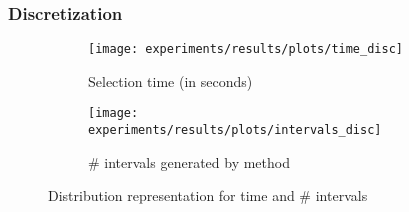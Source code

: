 \documentclass[preprint,12pt]{elsarticle}
\begin{document}
\begin{table}[!htp]
\renewcommand{\arraystretch}{1.3}
\centering
\scriptsize
\caption{Wilcoxon test results and average rankings of methods (Friedman Procedure \& Adjusted p-value with Holm's Test) for accuracy}
\label{tab:wilcoxon-isel}
\end{table}

\subsubsection*{Discretization}

\begin{figure}
\begin{subfigure}{.5\textwidth}
  \centering
  \texttt{[image: experiments/results/plots/time\_disc]}
  \caption{Selection time (in seconds)}
  \label{fig:time-disc}
\end{subfigure}%
\begin{subfigure}{.5\textwidth}
  \centering
  \texttt{[image: experiments/results/plots/intervals\_disc]}
  \caption{\# intervals generated by method}
  \label{fig:interv-disc}
\end{subfigure}
\caption{Distribution representation for time and \# intervals}
\label{fig:disc}
\end{figure}
\end{document}
